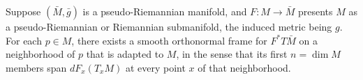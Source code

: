 \begin{proposition}
\label{prop:pseudo-riemannian-adapted-frame}
\leanok
{}
Suppose $(\bar{M}, \bar{g})$ is a pseudo-Riemannian manifold, and $F : M \to \bar{M}$ presents $M$ as a pseudo-Riemannian or Riemannian submanifold, the induced metric being $g$. For each $p \in M$, there exists a smooth orthonormal frame for $F^* T\bar{M}$ on a neighborhood of $p$ that is adapted to $M$, in the sense that its first $n = \dim M$ members span $dF_x(T_xM)$ at every point $x$ of that neighborhood.
\end{proposition}

